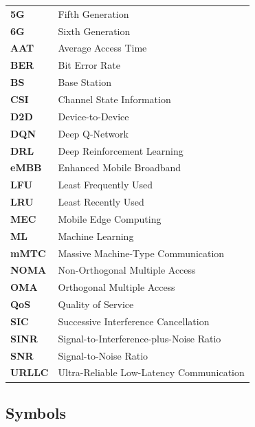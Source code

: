 \documentclass[12pt,a4paper]{article}
\begin{document}
\begin{tabular}{@{}ll@{}}
\textbf{5G} & Fifth Generation \\
\textbf{6G} & Sixth Generation \\
\textbf{AAT} & Average Access Time \\
\textbf{BER} & Bit Error Rate \\
\textbf{BS} & Base Station \\
\textbf{CSI} & Channel State Information \\
\textbf{D2D} & Device-to-Device \\
\textbf{DQN} & Deep Q-Network \\
\textbf{DRL} & Deep Reinforcement Learning \\
\textbf{eMBB} & Enhanced Mobile Broadband \\
\textbf{LFU} & Least Frequently Used \\
\textbf{LRU} & Least Recently Used \\
\textbf{MEC} & Mobile Edge Computing \\
\textbf{ML} & Machine Learning \\
\textbf{mMTC} & Massive Machine-Type Communication \\
\textbf{NOMA} & Non-Orthogonal Multiple Access \\
\textbf{OMA} & Orthogonal Multiple Access \\
\textbf{QoS} & Quality of Service \\
\textbf{SIC} & Successive Interference Cancellation \\
\textbf{SINR} & Signal-to-Interference-plus-Noise Ratio \\
\textbf{SNR} & Signal-to-Noise Ratio \\
\textbf{URLLC} & Ultra-Reliable Low-Latency Communication \\
\end{tabular}

\subsection*{Symbols}
\end{document}
